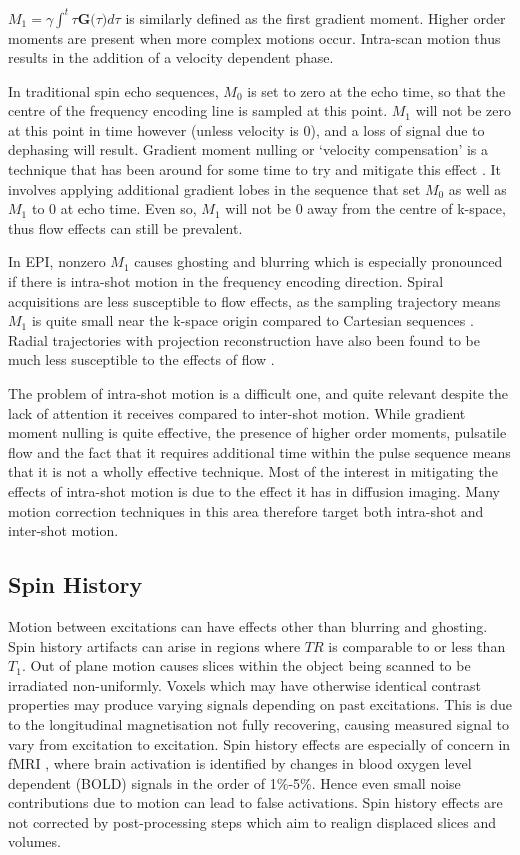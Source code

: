 \documentclass[class=article, crop=false]{standalone}
\begin{document}
$M_1 = \gamma\int^t\tau\textbf{G($\tau$)}d\tau$ is similarly defined as the first gradient moment. Higher order moments are present when more complex motions occur. Intra-scan motion thus results in the addition of a velocity dependent phase.
\par
In traditional spin echo sequences, $M_0$ is set to zero at the echo time, so that the centre of the frequency encoding line is sampled at this point. $M_1$ will not be zero at this point in time however (unless velocity is 0), and a loss of signal due to dephasing will result. Gradient moment nulling or `velocity compensation' is a technique that has been around for some time to try and mitigate this effect \parencite{Haacke1987}. It involves applying additional gradient lobes in the sequence that set $M_0$ as well as $M_1$ to $0$ at echo time. Even so, $M_1$ will not be $0$ away from the centre of k-space, thus flow effects can still be prevalent.
\par
In EPI, nonzero $M_1$ causes ghosting and blurring which is especially pronounced if there is intra-shot motion in the frequency encoding direction. Spiral acquisitions are less susceptible to flow effects, as the sampling trajectory means $M_1$ is quite small near the k-space origin compared to Cartesian sequences \parencite{Irarrazaval1999,Nishimura}. Radial trajectories with projection reconstruction have also been found to be much less susceptible to the effects of flow \parencite{Nishimura1991}.
\par
The problem of intra-shot motion is a difficult one, and quite relevant despite the lack of attention it receives compared to inter-shot motion. While gradient moment nulling is quite effective, the presence of higher order moments, pulsatile flow and the fact that it requires additional time within the pulse sequence means that it is not a wholly effective technique. Most of the interest in mitigating the effects of intra-shot motion is due to the effect it has in diffusion imaging. Many motion correction techniques in this area therefore target both intra-shot and inter-shot motion.

\subsection{Spin History}
Motion between excitations can have effects other than blurring and ghosting. Spin history artifacts can arise in regions where $TR$ is comparable to or less than $T_1$. Out of plane motion causes slices within the object being scanned to be irradiated non-uniformly. Voxels which may have otherwise identical contrast properties may produce varying signals depending on past excitations. This is due to the longitudinal magnetisation not fully recovering, causing measured signal to vary from excitation to excitation. Spin history effects are especially of concern in fMRI \parencite{Friston1996,Muresan2005}, where brain activation is identified by changes in blood oxygen level dependent (BOLD) signals in the order of 1\%-5\%. Hence even small noise contributions due to motion can lead to false activations. Spin history effects are not corrected by post-processing steps which aim to realign displaced slices and volumes.
\end{document}
